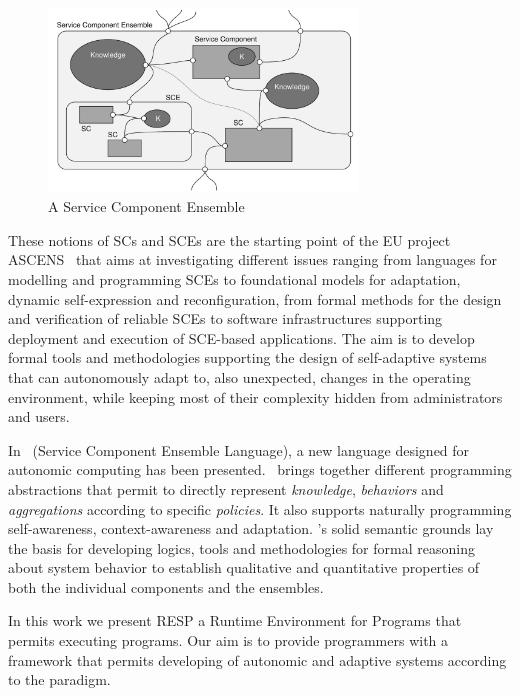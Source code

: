 \documentclass[11pt]{article}
\newcommand{\resp}{\textsf{RESP}}
\begin{document}
\begin{figure}[tp]
\centering
\includegraphics[width=8.2cm]{sce}
\vspace*{-.4cm}
\caption{A Service Component Ensemble}
\vspace*{-.3cm}
\label{ensemble}
\end{figure}

These notions of SCs and SCEs are the starting point of the EU project ASCENS~\cite{ascens,ASCENSatFMCO11} that aims at investigating different issues ranging from languages for modelling and programming SCEs to foundational models for adaptation, dynamic self-expression and reconfiguration, from formal methods for the design and verification of reliable SCEs to software infrastructures supporting deployment and execution of SCE-based applications. The aim is to develop formal tools and methodologies supporting the design of self-adaptive systems that can autonomously adapt to, also unexpected, changes in the operating environment, while keeping most of their complexity hidden from administrators and users.

In~\cite{SCEL} \SCEL{} (Service Component Ensemble Language), a new language designed for  autonomic computing has been presented. \SCEL\ brings together different programming abstractions that permit to directly represent \emph{knowledge}, \emph{behaviors} and \emph{aggregations} according to specific \emph{policies}. It also supports naturally programming self-awareness, context-awareness and adaptation. \SCEL's solid semantic grounds lay the basis for developing logics, tools and methodologies for formal reasoning about system behavior to establish qualitative and quantitative properties of both the individual components and the ensembles.

In this work we present \resp{} a Runtime Environment for \SCEL{} Programs that permits executing \SCEL{} programs. 
Our aim is to provide programmers with a framework that permits developing of autonomic and adaptive
systems according to the \SCEL{} paradigm. 
\end{document}
